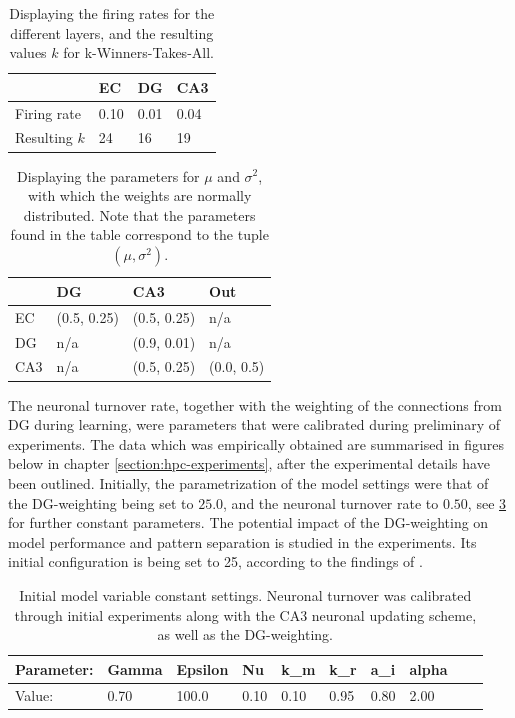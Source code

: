 \begin{table}
\centering
\caption{Displaying the firing rates for the different layers, and the resulting values $k$ for k-Winners-Takes-All.}
\label{table:firing_rates}
\begin{tabular}{l|l|l|l|}
\cline{2-4}
                                  & EC   & DG   & CA3  \\ \hline
\multicolumn{1}{|l|}{Firing rate} & 0.10 & 0.01 & 0.04 \\ \hline
\multicolumn{1}{|l|}{Resulting $k$} & 24 & 16 & 19 \\ \hline
\end{tabular}
\end{table}

\begin{table}[]
\centering
\caption{Displaying the parameters for $\mu$ and $\sigma^2$, with which the weights are normally distributed. Note that the parameters found in the table correspond to the tuple $(\mu, \sigma^2)$.}
\label{table:initial_weight_distributions}
\begin{tabular}{l|l|l|l|}
\cline{2-4}
                          & DG        & CA3       & Out      \\ \hline
\multicolumn{1}{|l|}{EC}  & (0.5, 0.25) & (0.5, 0.25) & n/a      \\ \hline
\multicolumn{1}{|l|}{DG}  & n/a       & (0.9, 0.01) & n/a      \\ \hline
\multicolumn{1}{|l|}{CA3} & n/a       & (0.5, 0.25) & (0.0, 0.5) \\ \hline
\end{tabular}
\end{table}

The neuronal turnover rate, together with the weighting of the connections from DG during learning, were parameters that were calibrated during preliminary of experiments. The data which was empirically obtained are summarised in figures below in chapter \ref{section:hpc-experiments}, after the experimental details have been outlined. Initially, the parametrization of the model settings were that of the DG-weighting being set to $25.0$, and the neuronal turnover rate to $0.50$, see \ref{table:initial_settings} for further constant parameters. The potential impact of the DG-weighting on model performance and pattern separation is studied in the experiments. Its initial configuration is being set to 25, according to the findings of \citep{Wakagi2008}.

\begin{table}
\centering
\caption{Initial model variable constant settings. Neuronal turnover was calibrated through initial experiments along with the CA3 neuronal updating scheme, as well as the DG-weighting.}
\label{table:initial_settings}
\begin{tabular}{|l|l|l|l|l|l|l|l|l|l|}
\cline{1-8}
Parameter: & Gamma & Epsilon & Nu   & k\_m & k\_r & a\_i & alpha \\ \hline
Value:     & 0.70  & 100.0   & 0.10 & 0.10 & 0.95 & 0.80 & 2.00 \\ \hline
\end{tabular}
\end{table}


